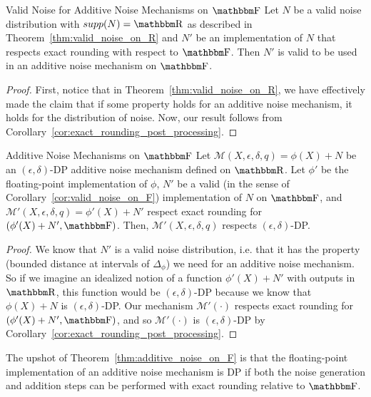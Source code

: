 \documentclass[11pt]{scrartcl} %
\begin{document}
\begin{corollary}
	\label{cor:valid_noise_on_F}
	Valid Noise for Additive Noise Mechanisms on $\F$ \newline
	Let $N$ be a valid noise distribution with $supp(N) = \R$ as described in Theorem~\ref{thm:valid_noise_on_R}
	and $N'$ be an implementation of $N$ that respects exact rounding with respect to $\F$.
	Then $N'$ is valid to be used in an additive noise mechanism on $\F$.

	\begin{proof}
		First, notice that in Theorem~\ref{thm:valid_noise_on_R}, we have
		effectively made the claim that if some property holds for an additive noise mechanism,
		it holds for the distribution of noise.
		Now, our result follows from Corollary~\ref{cor:exact_rounding_post_processing}.
	\end{proof}
\end{corollary}

\begin{theorem}
	\label{thm:additive_noise_on_F}
	Additive Noise Mechanisms on $\F$ \newline
	Let $\mathcal{M}(X, \epsilon, \delta, q) = \phi(X) + N$ be an $(\epsilon, \delta)$-DP additive noise mechanism
	defined on $\R$.
	Let $\phi'$ be the floating-point implementation of $\phi$,
	$N'$ be a valid (in the sense of Corollary~\ref{cor:valid_noise_on_F})
	implementation of $N$ on $\F$, and $\mathcal{M'}(X, \epsilon, \delta, q) = \phi'(X) + N'$
	respect exact rounding for $(\phi'(X)+N', \F)$.
	Then, $\mathcal{M'}(X, \epsilon, \delta, q)$ respects $(\epsilon, \delta)$-DP.

	\begin{proof}
		We know that $N'$ is a valid noise distribution, i.e. that it has the property (bounded distance at
		intervals of $\Delta_{\phi}$) we need for an additive noise mechanism.
		So if we imagine an idealized notion of a function $\phi'(X) + N'$ with outputs in $\R$,
		this function would be $(\epsilon, \delta)$-DP because we know that $\phi(X) + N$ is $(\epsilon, \delta)$-DP.
		Our mechanism $\mathcal{M'}(\cdot)$ respects exact rounding for $(\phi'(X) + N', \F)$, and so
		$\mathcal{M'}(\cdot)$ is $(\epsilon,\delta)$-DP by Corollary~\ref{cor:exact_rounding_post_processing}.
	\end{proof}
\end{theorem}
The upshot of Theorem~\ref{thm:additive_noise_on_F} is that the floating-point implementation of
an additive noise mechanism is DP if both the noise generation and addition steps can be performed
with exact rounding relative to $\F$.




\end{document}
